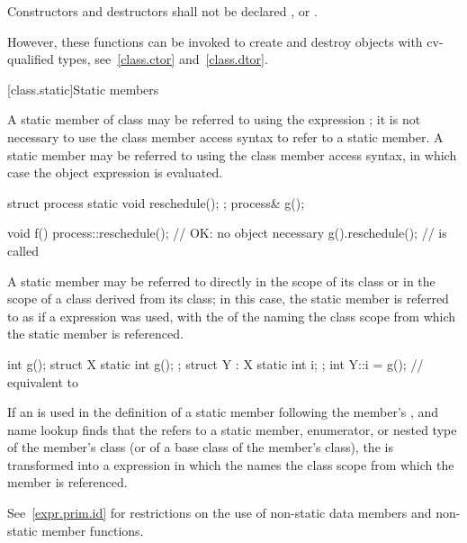 \pnum
{}%
%
%
%
Constructors and destructors shall
not be declared ,  or 
. \begin{note} However, these functions can be invoked to
create and destroy objects with cv-qualified types,
see~\ref{class.ctor} and~\ref{class.dtor}.
\end{note}

[class.static]{Static members}%
%

\pnum
A static member  of class  may be referred to
using the  expression ; it is not
necessary to use the class member access syntax to
refer to a static member. A static member may be
referred to using the class member access syntax, in which case the
object expression is evaluated.
\begin{example}

\begin{codeblock}
struct process {
  static void reschedule();
};
process& g();

void f() {
  process::reschedule();        // OK: no object necessary
  g().reschedule();             //  is called
}
\end{codeblock}
\end{example}

\pnum
A static member may be referred to directly in the scope of its
class or in the scope of a class derived
from its class; in this case, the static member is referred to
as if a  expression was used, with the
 of the  naming
the class scope from which the static member is referenced.
\begin{example}

\begin{codeblock}
int g();
struct X {
  static int g();
};
struct Y : X {
  static int i;
};
int Y::i = g();                 // equivalent to 
\end{codeblock}
\end{example}

\pnum
If an  is used in the
definition of a static member following the member's
, and name lookup
finds that the  refers to a static
member, enumerator, or nested type of the member's class (or of a base
class of the member's class), the  is
transformed into a  expression in which the
 names the class scope from which the
member is referenced.
\begin{note}
See~\ref{expr.prim.id} for restrictions on the use of non-static data
members and non-static member functions.
\end{note}


